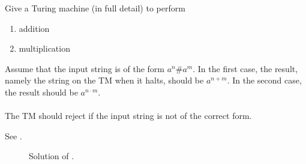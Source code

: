 \documentclass{article}
\begin{document}
\begin{exercise}
Give a Turing machine (in full detail) to perform
\begin{enumerate}
 \item addition
 \item multiplication
\end{enumerate}
Assume that the input string is of the form $a^n\#a^m$. In the first case, the result, namely the string on the TM when it halts, should be $a^{n+m}$. In the second case, the result should be $a^{n\cdot m}$.
\paragraph{}
The TM should reject if the input string is not of the correct form.
\begin{answer}
See .
\begin{figure}[hbt]
\centering
{}
\caption{Solution of .}
\end{figure}
\end{answer}
\end{exercise}
\end{document}
